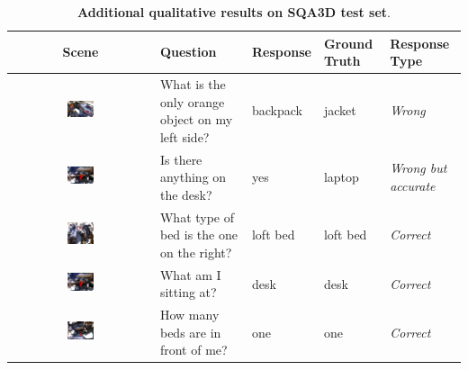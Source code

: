 \begin{table}[t!]
    \centering
    \caption{\textbf{Additional qualitative results on SQA3D test set}.}
    \small
    \begin{tabular}{c|p{6em}|p{6em}|p{8em}|p{6em}}
        \toprule
         Scene & Question & Response & Ground Truth & Response Type \\
         \midrule
         \raisebox{-1\height}
         {\includegraphics[width=0.2\textwidth]{figs/vis_sqa_2.jpg}} & What is the only orange object on my left side? & backpack & jacket & \textit{Wrong} \\
         \midrule
         \raisebox{-1\height}
         {\includegraphics[width=0.2\textwidth]{figs/vis_sqa_4.jpg}} & Is there anything on the desk? & yes & laptop & \textit{Wrong but accurate} \\
         \midrule
         \raisebox{-1\height}
         {\includegraphics[width=0.2\textwidth,]{figs/vis_sqa_1.jpg}} & What type of bed is the one on the right? & loft bed & loft bed & \textit{Correct} \\
         \midrule
         \raisebox{-1\height}
         {\includegraphics[width=0.2\textwidth]{figs/vis_sqa_4.jpg}} & What am I sitting at? & desk & desk & \textit{Correct} \\
         \midrule
         \raisebox{-1\height}
         {\includegraphics[width=0.2\textwidth]{figs/vis_sqa_5.jpg}} & How many beds are in front of me? & one & one & \textit{Correct} \\
         \bottomrule
    \end{tabular}
    
    \label{tab:sqa_add}
\end{table}

